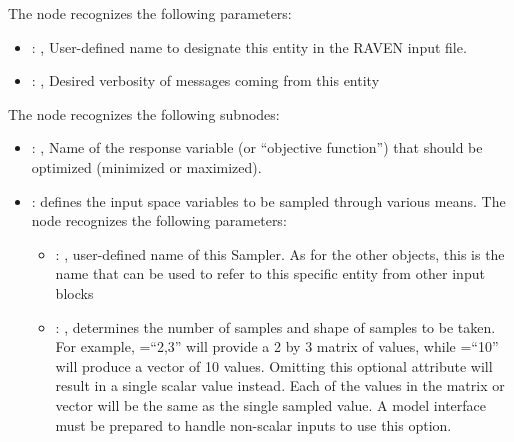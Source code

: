   The  node recognizes the following parameters:
    \begin{itemize}
      \item {}: , 
        User-defined name to designate this entity in the RAVEN input file.
      \item {}: , 
        Desired verbosity of messages coming from this entity
  \end{itemize}

  The  node recognizes the following subnodes:
  \begin{itemize}
    \item {}: , 
      Name of the response variable (or ``objective function'') that should be optimized
      (minimized or maximized).

    \item {}:
      defines the input space variables to be sampled through various means.
      The  node recognizes the following parameters:
        \begin{itemize}
          \item {}: , 
            user-defined name of this Sampler. \nb As for the other objects,               this is
            the name that can be used to refer to this specific entity from other input blocks
          \item {}: , 
            determines the number of samples and shape of samples               to be taken.  For
            example, =``2,3'' will provide a 2 by 3               matrix of values,
            while =``10'' will produce a vector of 10 values.               Omitting
            this optional attribute will result in a single scalar value instead.               Each
            of the values in the matrix or vector will be the same as the single sampled value.
            \nb A model interface must be prepared to handle non-scalar inputs to use this option.
      \end{itemize}


\end{itemize}
